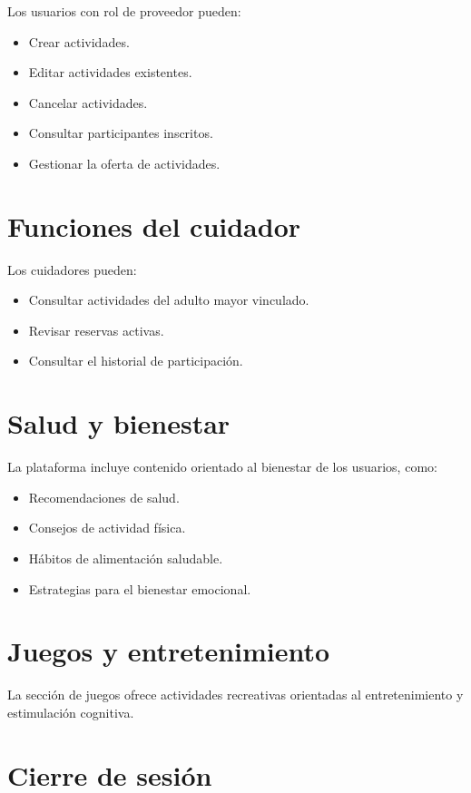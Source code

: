 \documentclass[12pt,a4paper]{article}
\begin{document}
Los usuarios con rol de proveedor pueden:

\begin{itemize}
\item Crear actividades.
\item Editar actividades existentes.
\item Cancelar actividades.
\item Consultar participantes inscritos.
\item Gestionar la oferta de actividades.
\end{itemize}

\section{Funciones del cuidador}

Los cuidadores pueden:

\begin{itemize}
\item Consultar actividades del adulto mayor vinculado.
\item Revisar reservas activas.
\item Consultar el historial de participación.
\end{itemize}

\section{Salud y bienestar}

La plataforma incluye contenido orientado al bienestar de los usuarios, como:

\begin{itemize}
\item Recomendaciones de salud.
\item Consejos de actividad física.
\item Hábitos de alimentación saludable.
\item Estrategias para el bienestar emocional.
\end{itemize}

\section{Juegos y entretenimiento}

La sección de juegos ofrece actividades recreativas orientadas al entretenimiento y estimulación cognitiva.

\section{Cierre de sesión}
\end{document}
